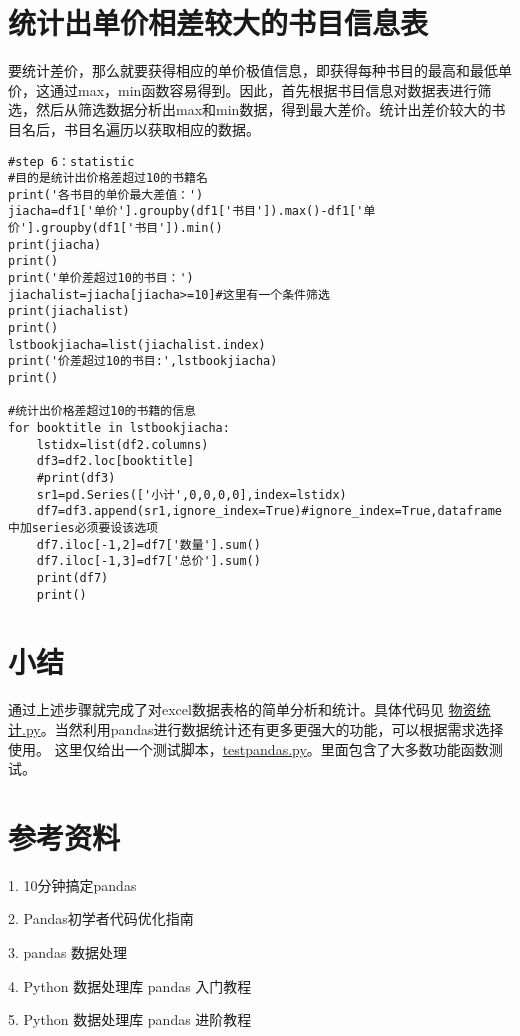\documentclass[twoside,11pt]{book}
\begin{document}
\section{统计出单价相差较大的书目信息表}

要统计差价，那么就要获得相应的单价极值信息，即获得每种书目的最高和最低单价，这通过max，min函数容易得到。因此，首先根据书目信息对数据表进行筛选，然后从筛选数据分析出max和min数据，得到最大差价。统计出差价较大的书目名后，书目名遍历以获取相应的数据。

\begin{lstlisting}
#step 6：statistic
#目的是统计出价格差超过10的书籍名
print('各书目的单价最大差值：')
jiacha=df1['单价'].groupby(df1['书目']).max()-df1['单价'].groupby(df1['书目']).min()
print(jiacha)
print()
print('单价差超过10的书目：')
jiachalist=jiacha[jiacha>=10]#这里有一个条件筛选
print(jiachalist)
print()
lstbookjiacha=list(jiachalist.index)
print('价差超过10的书目:',lstbookjiacha)
print()

#统计出价格差超过10的书籍的信息
for booktitle in lstbookjiacha:
    lstidx=list(df2.columns)
    df3=df2.loc[booktitle]
    #print(df3)
    sr1=pd.Series(['小计',0,0,0,0],index=lstidx)
    df7=df3.append(sr1,ignore_index=True)#ignore_index=True,dataframe中加series必须要设该选项
    df7.iloc[-1,2]=df7['数量'].sum()
    df7.iloc[-1,3]=df7['总价'].sum()
    print(df7)
    print()
\end{lstlisting}

\section{小结}

通过上述步骤就完成了对excel数据表格的简单分析和统计。具体代码见
\href{run:src/物资统计.py}{物资统计.py}。当然利用pandas进行数据统计还有更多更强大的功能，可以根据需求选择使用。
这里仅给出一个测试脚本，\href{run:src/testpandas.py}{testpandas.py}。里面包含了大多数功能函数测试。

\section{参考资料}

1. 10分钟搞定pandas

2. Pandas初学者代码优化指南

3. pandas 数据处理

4. Python 数据处理库 pandas 入门教程

5. Python 数据处理库 pandas 进阶教程
\end{document}
